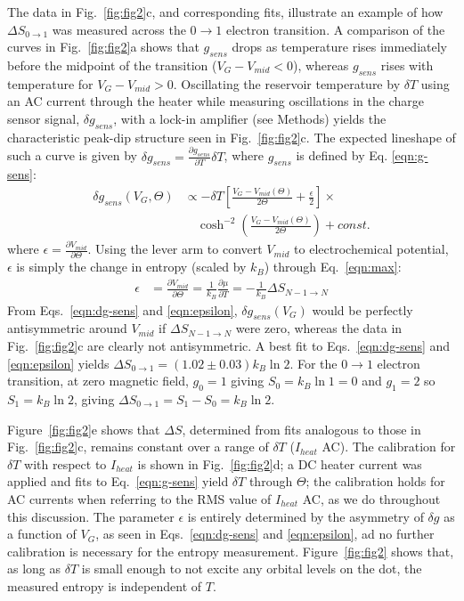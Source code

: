 \documentclass[twocolumn,showpacs,amsmath,amssymb,prl,aps,superscriptaddress]{revtex4-1}
\begin{document}
The data in Fig.~\ref{fig:fig2}c, and corresponding fits, illustrate an example of how $\Delta S_{0\rightarrow 1}$ was measured across the $0 \rightarrow 1$ electron transition.  A comparison of the curves in Fig.~\ref{fig:fig2}a shows that $g_{sens}$ drops as temperature rises immediately before the midpoint of the transition ($V_G-V_{mid}<0$), whereas $g_{sens}$ rises with temperature for $V_G-V_{mid}>0$.   Oscillating the reservoir temperature by $\delta T$ using an AC current through the heater while measuring oscillations in the charge sensor signal, $\delta g_{sens}$, with a lock-in amplifier (see Methods) yields the characteristic peak-dip structure seen in Fig.~\ref{fig:fig2}c. The expected lineshape of such a curve is given by $\delta g_{sens} = \frac{\partial g_{sens}}{\partial T} \delta T$, where $g_{sens}$ is defined by Eq. \ref{eqn:g-sens}:
%
\begin{align}
\label{eqn:dg-sens}
        \delta g_{sens}(V_G, \Theta) &\propto -\delta T \left[ \frac{V_G-V_{mid}(\Theta)}{2\Theta} + \frac{\epsilon}{2} \right]\times \\
        				      &\quad\cosh^{-2}\left(\frac{V_G-V_{mid}(\Theta)}{2\Theta}\right) + const. \nonumber
\end{align}
%
where $\epsilon=\frac{\partial V_{mid}}{\partial \Theta}$. Using the lever arm to convert $V_{mid}$ to electrochemical potential, $\epsilon$ is simply the change in entropy (scaled by $k_B$) through Eq.~\ref{eqn:max}:
%
\begin{align}
\label{eqn:epsilon}
        \epsilon &= \frac{\partial V_{mid}}{\partial \Theta} = 
        \frac{1}{k_B} \frac{\partial \mu}{\partial T} = 
        -\frac{1}{k_B} \Delta S_{N-1\rightarrow N}
\end{align}
%
From Eqs.~\ref{eqn:dg-sens} and \ref{eqn:epsilon}, $\delta g_{sens}(V_G)$ would be perfectly antisymmetric around $V_{mid}$ if $\Delta S_{N-1\rightarrow N}$ were zero, whereas the data in Fig.~\ref{fig:fig2}c are clearly not antisymmetric. A best fit to Eqs.~\ref{eqn:dg-sens} and \ref{eqn:epsilon} yields $\Delta S_{0\rightarrow 1}=(1.02 \pm 0.03) k_B \ln{2}$. For the $0 \rightarrow 1$ electron transition, at zero magnetic field, $g_0=1$ giving $S_0=k_B \ln{1}=0$ and $g_1=2$ so $S_1=k_B \ln{2}$, giving $\Delta S_{0 \rightarrow 1} = S_1 - S_0 =k_B\ln{2}$.

Figure~\ref{fig:fig2}e shows that $\Delta S$, determined from fits analogous to those in Fig.~\ref{fig:fig2}c, remains constant over a range of $\delta T$ ($I_{heat}$ AC). The calibration for $\delta T$ with respect to $I_{heat}$ is shown in Fig.~\ref{fig:fig2}d; a DC heater current was applied and fits to Eq.~\ref{eqn:g-sens} yield $\delta T$ through $\Theta$; the calibration holds for AC currents when referring to the RMS value of $I_{heat}$ AC, as we do throughout this discussion. The parameter $\epsilon$ is entirely determined by the asymmetry of $\delta g$ as a function of $V_G$, as seen in Eqs.~\ref{eqn:dg-sens} and \ref{eqn:epsilon}, ad no further calibration is necessary for the entropy measurement. Figure~\ref{fig:fig2} shows that, as long as $\delta T$ is small enough to not excite any orbital levels on the dot, the measured entropy is independent of $T$.
\end{document}
